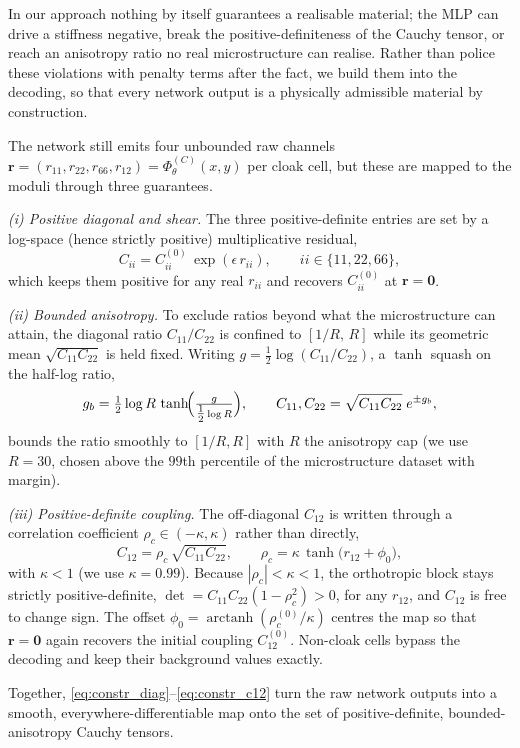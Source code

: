 \documentclass[preprint,12pt]{elsarticle}
\newcommand{\mbf}[1]{\mathbf{#1}}
\newcommand{\be}{\begin{equation}}
\newcommand{\ee}{\end{equation}}
\begin{document}
In our approach nothing by itself guarantees 
a realisable material; the MLP can drive
a stiffness negative, break the positive-definiteness of the Cauchy
tensor, or reach an anisotropy ratio no real microstructure can realise.
Rather than police these violations with penalty terms after the fact, we
build them into the decoding, so that every network output is a
physically admissible material by construction.

The network still emits four unbounded raw channels
$\mbf{r}=(r_{11},r_{22},r_{66},r_{12})=\Phi_\theta^{(C)}(x,y)$ per cloak
cell, but these are mapped to the moduli through three guarantees.

\emph{(i) Positive diagonal and shear.} The three positive-definite
entries are set by a log-space (hence strictly positive) multiplicative
residual,
\be\label{eq:constr_diag}
  C_{ii} = C_{ii}^{(0)}\,\exp(\epsilon\,r_{ii}),
  \qquad ii\in\{11,22,66\},
\ee
which keeps them positive for any real $r_{ii}$ and recovers
$C_{ii}^{(0)}$ at $\mbf{r}=\mbf 0$.

\emph{(ii) Bounded anisotropy.} To exclude ratios beyond what the
microstructure can attain, the diagonal ratio $C_{11}/C_{22}$ is confined
to $[1/R,\,R]$ while its geometric mean $\sqrt{C_{11}C_{22}}$ is held
fixed. Writing $g=\tfrac12\log(C_{11}/C_{22})$, a $\tanh$ squash on the
half-log ratio,
\be\label{eq:constr_aniso}
  g_b = \tfrac12\log R\,\tanh\!\Bigl(\tfrac{g}{\tfrac12\log R}\Bigr),
  \qquad
  C_{11},C_{22}=\sqrt{C_{11}C_{22}}\;e^{\pm g_b},
\ee
bounds the ratio smoothly to $[1/R,R]$ with $R$ the anisotropy cap (we
use $R=30$, chosen above the $99$th percentile of the microstructure
dataset with margin).

\emph{(iii) Positive-definite coupling.} The off-diagonal $C_{12}$ is
written through a correlation coefficient $\rho_c\in(-\kappa,\kappa)$
rather than directly,
\be\label{eq:constr_c12}
  C_{12}=\rho_c\,\sqrt{C_{11}C_{22}},
  \qquad
  \rho_c=\kappa\,\tanh\!\bigl(r_{12}+\phi_0\bigr),
\ee
with $\kappa<1$ (we use $\kappa=0.99$). Because $|\rho_c|<\kappa<1$, the
orthotropic block stays strictly positive-definite,
$\det=C_{11}C_{22}(1-\rho_c^2)>0$, for any $r_{12}$, and $C_{12}$ is free
to change sign. The offset $\phi_0=\operatorname{arctanh}(\rho_c^{(0)}/\kappa)$
centres the map so that $\mbf{r}=\mbf 0$ again recovers the initial
coupling $C_{12}^{(0)}$. Non-cloak cells bypass the decoding and keep
their background values exactly.

Together, \eqref{eq:constr_diag}--\eqref{eq:constr_c12} turn the raw
network outputs into a smooth, everywhere-differentiable map onto
the set of positive-definite, bounded-anisotropy Cauchy tensors.
\end{document}
